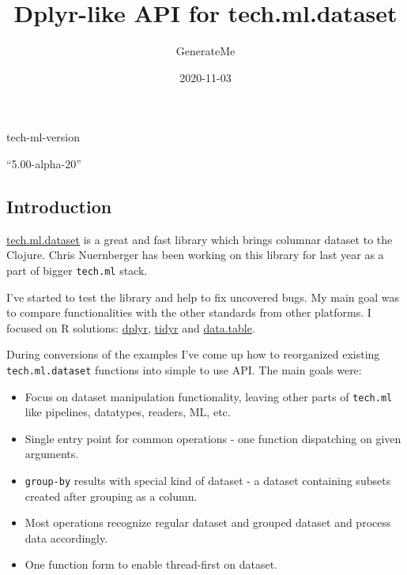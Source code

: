 \documentclass[]{article}
\title{Dplyr-like API for tech.ml.dataset}
\author{GenerateMe}
\date{2020-11-03}
\newenvironment{Shaded}{\begin{snugshade}}{\end{snugshade}}
\newcommand{\NormalTok}[1]{#1}
\providecommand{\tightlist}{%
  \setlength{\itemsep}{0pt}\setlength{\parskip}{0pt}}
\begin{document}
\maketitle

\begin{Shaded}
\begin{Highlighting}[]
\NormalTok{tech-ml-version}
\end{Highlighting}
\end{Shaded}

``5.00-alpha-20''

\hypertarget{introduction}{%
\subsection{Introduction}\label{introduction}}

\href{https://github.com/techascent/tech.ml.dataset}{tech.ml.dataset} is
a great and fast library which brings columnar dataset to the Clojure.
Chris Nuernberger has been working on this library for last year as a
part of bigger \texttt{tech.ml} stack.

I've started to test the library and help to fix uncovered bugs. My main
goal was to compare functionalities with the other standards from other
platforms. I focused on R solutions:
\href{https://dplyr.tidyverse.org/}{dplyr},
\href{https://tidyr.tidyverse.org/}{tidyr} and
\href{https://rdatatable.gitlab.io/data.table/}{data.table}.

During conversions of the examples I've come up how to reorganized
existing \texttt{tech.ml.dataset} functions into simple to use API. The
main goals were:

\begin{itemize}
\tightlist
\item
  Focus on dataset manipulation functionality, leaving other parts of
  \texttt{tech.ml} like pipelines, datatypes, readers, ML, etc.
\item
  Single entry point for common operations - one function dispatching on
  given arguments.
\item
  \texttt{group-by} results with special kind of dataset - a dataset
  containing subsets created after grouping as a column.
\item
  Most operations recognize regular dataset and grouped dataset and
  process data accordingly.
\item
  One function form to enable thread-first on dataset.
\end{itemize}
\end{document}

